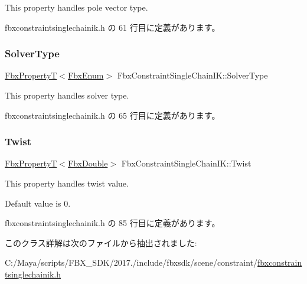 This property handles pole vector type. 

 fbxconstraintsinglechainik.\+h の 61 行目に定義があります。

\mbox{\label{class_fbx_constraint_single_chain_i_k_a2ed14960ba042a0c7f447306560bbe11}} 
\subsubsection{\texorpdfstring{Solver\+Type}{SolverType}}
{\footnotesize\ttfamily \hyperlink{class_fbx_property_t}{Fbx\+PropertyT}$<$\hyperlink{fbxtypes_8h_a9a28614cb4272a0ad7d748eda7f3d3e5}{Fbx\+Enum}$>$ Fbx\+Constraint\+Single\+Chain\+I\+K\+::\+Solver\+Type}

This property handles solver type. 

 fbxconstraintsinglechainik.\+h の 65 行目に定義があります。

\mbox{\label{class_fbx_constraint_single_chain_i_k_a3756b61ba9a55d15c00229fc9a670e4e}} 
\subsubsection{\texorpdfstring{Twist}{Twist}}
{\footnotesize\ttfamily \hyperlink{class_fbx_property_t}{Fbx\+PropertyT}$<$\hyperlink{fbxtypes_8h_a171e72a1c46fc15c1a6c9c31948c1c5b}{Fbx\+Double}$>$ Fbx\+Constraint\+Single\+Chain\+I\+K\+::\+Twist}

This property handles twist value.

Default value is 0. 

 fbxconstraintsinglechainik.\+h の 85 行目に定義があります。



このクラス詳解は次のファイルから抽出されました\+:\begin{DoxyCompactItemize}
\item 
C\+:/\+Maya/scripts/\+F\+B\+X\+\_\+\+S\+D\+K/2017./include/fbxsdk/scene/constraint/\hyperlink{fbxconstraintsinglechainik_8h}{fbxconstraintsinglechainik.\+h}\end{DoxyCompactItemize}
